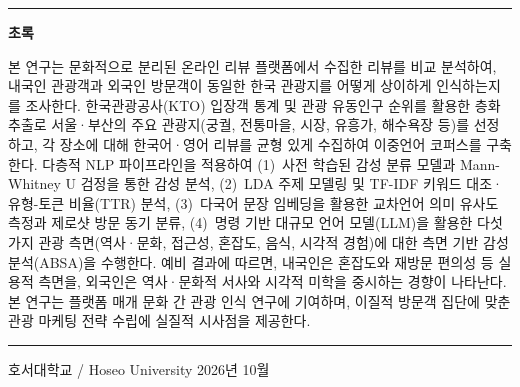 \documentclass[11pt,a4paper]{article}
\begin{document}
\vspace{8pt}
\noindent\rule{\linewidth}{0.4pt}
\vspace{4pt}

\noindent\textbf{초록}

\vspace{2pt}

\noindent
본 연구는 문화적으로 분리된 온라인 리뷰 플랫폼에서 수집한 리뷰를 비교 분석하여,
내국인 관광객과 외국인 방문객이 동일한 한국 관광지를 어떻게 상이하게 인식하는지를
조사한다. 한국관광공사(KTO) 입장객 통계 및 관광 유동인구 순위를 활용한 층화
추출로 서울·부산의 주요 관광지(궁궐, 전통마을, 시장, 유흥가, 해수욕장 등)를
선정하고, 각 장소에 대해 한국어·영어 리뷰를 균형 있게 수집하여 이중언어
코퍼스를 구축한다. 다층적 NLP 파이프라인을 적용하여 (1)~사전 학습된 감성 분류
모델과 Mann-Whitney U 검정을 통한 감성 분석, (2)~LDA 주제 모델링 및 TF-IDF
키워드 대조·유형-토큰 비율(TTR) 분석, (3)~다국어 문장 임베딩을 활용한
교차언어 의미 유사도 측정과 제로샷 방문 동기 분류, (4)~명령 기반 대규모
언어 모델(LLM)을 활용한 다섯 가지 관광 측면(역사·문화, 접근성, 혼잡도, 음식,
시각적 경험)에 대한 측면 기반 감성 분석(ABSA)을 수행한다. 예비 결과에 따르면,
내국인은 혼잡도와 재방문 편의성 등 실용적 측면을, 외국인은 역사·문화적 서사와
시각적 미학을 중시하는 경향이 나타난다. 본 연구는 플랫폼 매개 문화 간 관광
인식 연구에 기여하며, 이질적 방문객 집단에 맞춘 관광 마케팅 전략 수립에
실질적 시사점을 제공한다.

\vspace{6pt}
\noindent\rule{\linewidth}{0.4pt}
\vspace{2pt}

{\small 호서대학교 / Hoseo University \hfill 2026년 10월}
\end{document}
